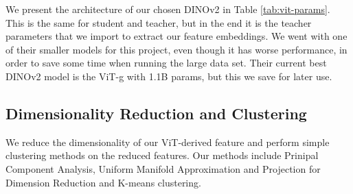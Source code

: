 We present the architecture of our chosen DINOv2 in Table \ref{tab:vit-params}. This is the same for student and teacher, but in the end it is the teacher parameters that we import to extract our feature embeddings. We went with one of their smaller models for this project, even though it has worse performance, in order to save some time when running the large data set. Their current best DINOv2 model is the ViT-g with 1.1B params, but this we save for later use.



\subsection{Dimensionality Reduction and Clustering}
We reduce the dimensionality of our ViT-derived feature and perform simple clustering methods on the reduced features. Our methods include Prinipal Component Analysis, Uniform Manifold Approximation and Projection for
Dimension Reduction and K-means clustering. 


